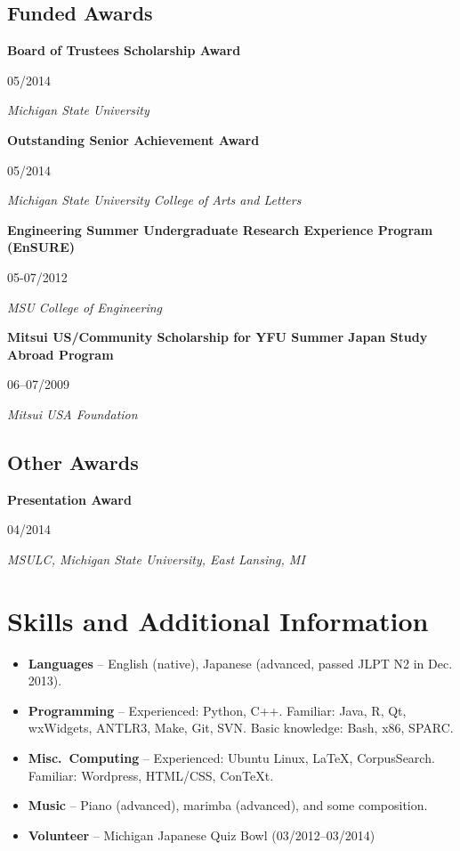 \documentclass[10pt,oneside]{article}
\newcommand{\ressection}[1]{
	\vspace{-12pt}
	\section*{#1}
}
\newcommand{\ressubsection}[1]{
	\subsection*{#1}
	\vspace{-4pt}
}
\newcommand{\resitem}[2]{
	\item \parbox[t]{0.8\textwidth}{#1} \hfill #2
}
\newcommand{\resbigitem}[4]{
	\item \parbox[t]{0.8\textwidth}{\textbf{#1}} \hfill #2 \\
		\parbox[t]{0.8\textwidth}{\textit{#3}} \hfill \textit{#4}
}
\begin{document}
\ressubsection{Funded Awards}
\begin{reslist}
	\resbigitem{Board of Trustees Scholarship Award}
		{05/2014}
		{Michigan State University}
		{}
	\resbigitem{Outstanding Senior Achievement Award}
		{05/2014}
		{Michigan State University College of Arts and Letters }
		{}
	\resbigitem{Engineering Summer Undergraduate Research Experience Program (EnSURE)}
		{05-07/2012}
		{MSU College of Engineering}
		{}
	\resbigitem{Mitsui US/Community Scholarship for YFU Summer Japan Study Abroad Program}
		{06--07/2009}
		{Mitsui USA Foundation}
		{}
\end{reslist}

\ressubsection{Other Awards}
\begin{reslist}
	\resbigitem{Presentation Award}
		{04/2014}
		{MSULC, Michigan State University, East Lansing, MI}
		{}
\end{reslist}



\ressection{Skills and Additional Information}

\begin{itemize}
	\item \textbf{Languages} -- English (native), Japanese (advanced, passed JLPT N2 in Dec. 2013).
	
	\item \textbf{Programming} -- Experienced: Python, C++. Familiar: Java, R, Qt, wxWidgets, ANTLR3, Make, Git, SVN. Basic knowledge: Bash, x86, SPARC.
	
	\item \textbf{Misc.\ Computing} -- Experienced: Ubuntu Linux, \LaTeX{}, CorpusSearch. Familiar: Wordpress, HTML/CSS, ConTeXt.
	
	\item \textbf{Music} --  Piano (advanced), marimba (advanced), and some composition.
	
	\item \textbf{Volunteer} -- Michigan Japanese Quiz Bowl (03/2012--03/2014)
\end{itemize}
\end{document}
